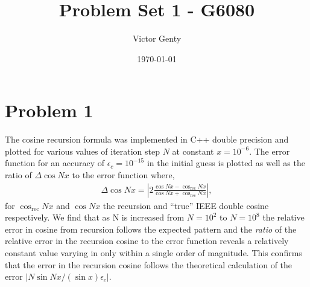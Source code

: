 \documentclass[singlepage,notitlepage,nofootinbib,11pt]{revtex4-1}
\begin{document}
\title{Problem Set 1 - G6080}
\author{Victor Genty}
\date{\today}
\maketitle
\section{Problem 1}
The cosine recursion formula  was implemented in C++ double precision and plotted for various values of iteration step $N$ at constant $x=10^{-6}$. The error function for an accuracy of $\epsilon_c = 10^{-15}$ in the initial guess is plotted as well as the ratio of $\Delta\cos Nx$ to the error function where,
\begin{align*}
\Delta\cos N x = \left|2\frac{\cos N x - \cos_{\text{rec}}Nx}{\cos N x + \cos_{\text{rec}}Nx}\right|,
\end{align*}
for $\cos_{\text{rec}} Nx$ and $\cos Nx$ the recursion and ``true'' IEEE double cosine respectively. We find that as N is increased from $N=10^{2}$ to $N=10^8$ the relative error in cosine from recursion follows the expected pattern and the {\it ratio} of the relative error in the recursion cosine to the error function reveals a relatively constant value varying in only within a single order of magnitude. This confirms that the error in the recursion cosine follows the theoretical calculation of the error $|N\sin N x/(\sin x)\epsilon_c|$.
\end{document}
